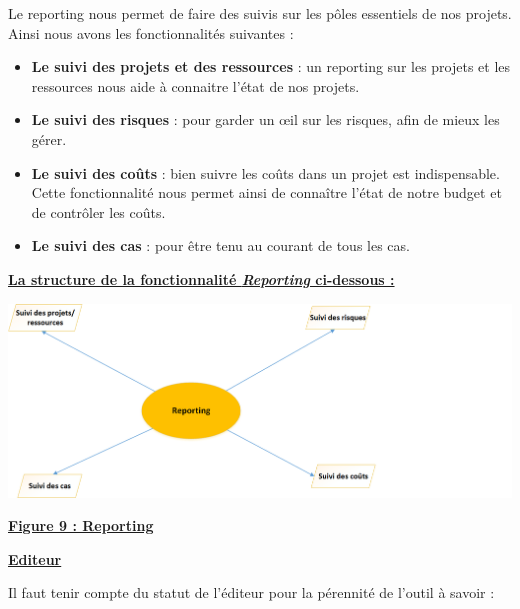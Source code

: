 \documentclass[11pt]{report}
\begin{document}
\hspace{1cm} Le reporting nous permet de faire des suivis sur les pôles essentiels de nos projets. Ainsi nous avons les fonctionnalités suivantes : 

\begin{itemize}
	\item \textbf{Le suivi des projets et des ressources} : un reporting sur les projets et les ressources nous aide à connaitre l’état de nos projets.

	\item \textbf{Le suivi des risques }: pour garder un œil sur les risques, afin de mieux les gérer.

	\item \textbf{Le suivi des coûts} : bien suivre les coûts dans un projet est indispensable. Cette fonctionnalité nous permet ainsi de connaître l’état de notre budget et de contrôler les coûts.

	\item \textbf{Le suivi des cas} : pour être tenu au courant de tous les cas.
\end{itemize}

\begin{center}
\underline{\textbf{La structure de la fonctionnalité \textit{Reporting}  ci-dessous :}}
\end{center}
\begin{center}
\includegraphics[scale=0.8]{images/figure9.png} 
\quad

\underline{\textbf{Figure 9 : Reporting}}
\end{center}
\quad

\begin{center}
\underline{\textbf{Editeur}} 
\end{center}

\hspace{1cm} Il faut tenir compte du statut de l’éditeur pour la pérennité de l’outil à savoir :
\end{document}
